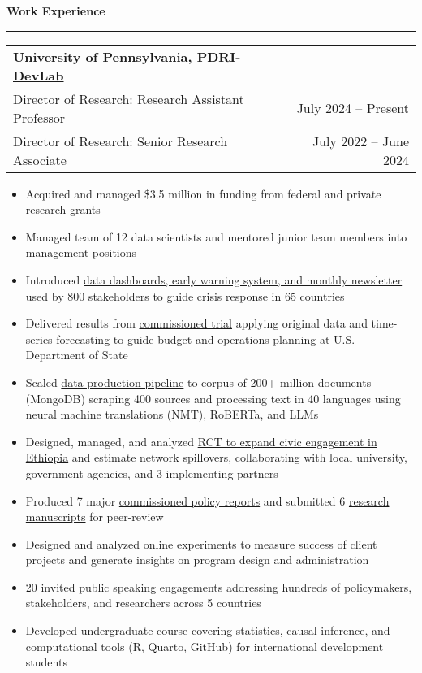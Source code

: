 \documentclass[11pt]{article}
\begin{document}
\textbf{\large Work Experience}\\
\rule[3mm]{\textwidth}{.2pt}
\noindent\begin{tabular*}{\textwidth}{@{}l@{\extracolsep{\fill}}r@{}}
\textbf{University of Pennsylvania, \href{https://web.sas.upenn.edu/dev-lab/}{PDRI-DevLab}}\\
Director of Research: Research Assistant Professor & July 2024 -- Present\\
Director of Research: Senior Research Associate & July 2022 -- June 2024\\
\end{tabular*}
\begin{itemize}[itemsep=0mm, parsep=0pt]
  \item Acquired and managed \$3.5 million in funding from federal and private research grants
  \item Managed team of 12 data scientists and mentored junior team members into management positions 
  \item Introduced \href{https://web.sas.upenn.edu/mlp-devlab/civic-space-data-and-forecasts/}{data dashboards, early warning system, and monthly newsletter} used by 800 stakeholders to guide crisis response in 65 countries
  \item Delivered results from \href{https://bpb-us-w2.wpmucdn.com/web.sas.upenn.edu/dist/4/872/files/2024/11/Forecasting-DOS-Travel-Advisories-with-Machine-Learning-for-Peace-Data-V2-internal.pdf}{commissioned trial} applying original data and time-series forecasting to guide budget and operations planning at U.S. Department of State
  \item Scaled \href{https://bpb-us-w2.wpmucdn.com/web.sas.upenn.edu/dist/4/872/files/2024/08/Presenting_MLP.pdf}{data production pipeline} to corpus of 200+ million documents (MongoDB) scraping 400 sources and processing text in 40 languages using neural machine translations (NMT), RoBERTa, and LLMs
  \item Designed, managed, and analyzed \href{https://jrspringman.github.io/files/ethiopia_ie.pdf}{RCT to expand civic engagement in Ethiopia} and estimate network spillovers, collaborating with local university, government agencies, and 3 implementing partners
  \item Produced 7 major \href{https://jrspringman.github.io/research.html#select-commissioned-policy-reports}{commissioned policy reports} and submitted 6 \href{https://jrspringman.github.io/research.html#under-review}{research manuscripts} for peer-review
   \item Designed and analyzed online experiments to measure success of client projects and generate insights on program design and administration
   \item 20 invited \href{https://jrspringman.github.io/public.html#world-bank-engagefest-webinar}{public speaking engagements} addressing hundreds of policymakers, stakeholders, and researchers across 5 countries
  \item Developed \href{https://jrspringman.github.io/psci3200-globaldev/}{undergraduate course} covering statistics, causal inference, and computational tools (R, Quarto, GitHub) for international development students
\end{itemize}
\end{document}
